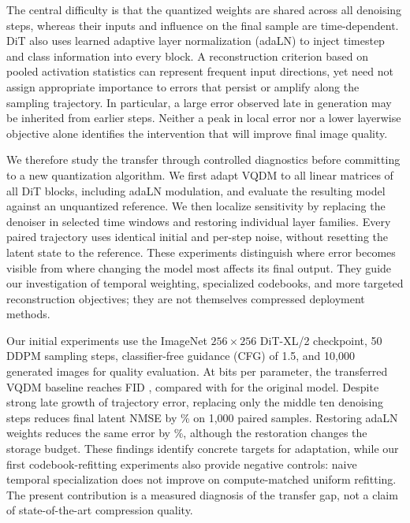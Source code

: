 \documentclass{article}
\begin{document}
The central difficulty is that the quantized weights are shared across all denoising steps, whereas their inputs and influence on the final sample are time-dependent. DiT also uses learned adaptive layer normalization (adaLN) to inject timestep and class information into every block. A reconstruction criterion based on pooled activation statistics can represent frequent input directions, yet need not assign appropriate importance to errors that persist or amplify along the sampling trajectory. In particular, a large error observed late in generation may be inherited from earlier steps. Neither a peak in local error nor a lower layerwise objective alone identifies the intervention that will improve final image quality.

We therefore study the transfer through controlled diagnostics before committing to a new quantization algorithm. We first adapt VQDM to all linear matrices of all DiT blocks, including adaLN modulation, and evaluate the resulting model against an unquantized reference. We then localize sensitivity by replacing the denoiser in selected time windows and restoring individual layer families. Every paired trajectory uses identical initial and per-step noise, without resetting the latent state to the reference. These experiments distinguish where error becomes visible from where changing the model most affects its final output. They guide our investigation of temporal weighting, specialized codebooks, and more targeted reconstruction objectives; they are not themselves compressed deployment methods.

Our initial experiments use the ImageNet $256\times256$ DiT-XL/2 checkpoint, 50 DDPM sampling steps, classifier-free guidance (CFG) of 1.5, and 10,000 generated images for quality evaluation. At \VQBits{} bits per parameter, the transferred VQDM baseline reaches FID \VQFID{}, compared with \OriginalFID{} for the original model. Despite strong late growth of trajectory error, replacing only the middle ten denoising steps reduces final latent NMSE by \MiddleGainThousand\% on 1,000 paired samples. Restoring adaLN weights reduces the same error by \AdaLNGainThousand\%, although the restoration changes the storage budget. These findings identify concrete targets for adaptation, while our first codebook-refitting experiments also provide negative controls: naive temporal specialization does not improve on compute-matched uniform refitting. The present contribution is a measured diagnosis of the transfer gap, not a claim of state-of-the-art compression quality.
\end{document}
